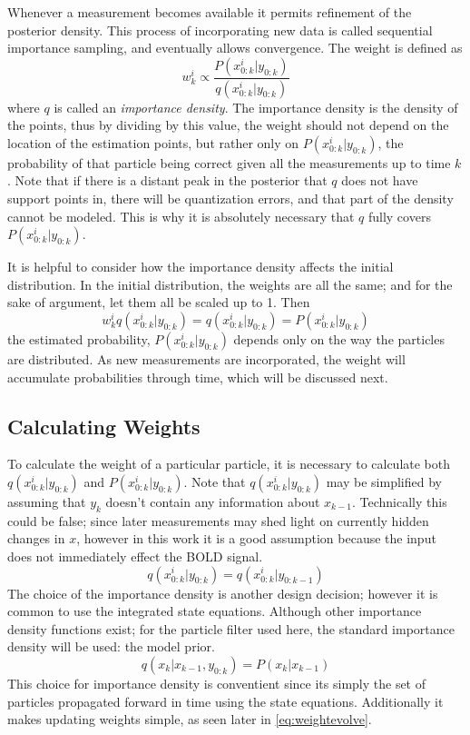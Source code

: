 Whenever a measurement becomes available it permits refinement of the
posterior density.
This process of incorporating new data is called sequential importance sampling,
and eventually allows convergence. The weight is defined as
\begin{equation}
w^i_k \propto \frac{P(x^i_{0:k} | y_{0:k})}{q(x^i_{0:k} | y_{0:k})}
\label{eq:weightfunc}
\end{equation}
where $q$ is called an \emph{importance density}. The importance density
is the density of the points, thus by dividing by this value, the weight
should not depend on the location of the estimation points, but rather
only on $P(x^i_{0:k} | y_{0:k})$, the probability of that particle
being correct given all the measurements up to time $k$. 
Note that if there is a distant peak in
the posterior that $q$ does not have support points in, there will 
be quantization errors, and that part of the density cannot be modeled. 
This is why it is absolutely necessary that $q$ fully covers 
$P(x^i_{0:k} | y_{0:k})$.

It is helpful
to consider how the importance density affects the initial distribution. 
In the initial distribution, the weights are all the same; and for
the sake of argument, let them all be scaled up to 1. Then
\begin{equation}
w^i_k q(x^i_{0:k} | y_{0:k}) = q(x^i_{0:k} | y_{0:k}) = P(x^i_{0:k} | y_{0:k})
\end{equation}
the estimated probability, $P(x^i_{0:k} | y_{0:k})$ depends only on the 
way the particles are distributed. As new measurements are incorporated,
the weight will accumulate probabilities through time, which will be discussed
next. 

\subsection{Calculating Weights}
To calculate the weight of a particular particle, it is necessary to 
calculate both $q(x^i_{0:k} | y_{0:k})$ and $P(x^i_{0:k} | y_{0:k})$.
Note that $q(x^i_{0:k} | y_{0:k})$ may be simplified by assuming that 
$y_k$ doesn't contain any information about $x_{k-1}$. Technically this 
could be false; since later measurements may shed light on currently hidden
changes in $x$, however in this work it is a good assumption because the
input does not immediately effect the \ac{BOLD} signal. 
\begin{equation}
q(x^i_{0:k} | y_{0:k}) = q(x^i_{0:k} | y_{0:k-1})
\label{eq:QAssump}
\end{equation}
The choice of the importance density is another design decision; however
it is common to use the integrated state equations. 
Although other importance density functions exist; for the particle filter
used here, the standard importance density will be used: the model
prior.
\begin{equation}
q(x_k | x_{k-1}, y_{0:k}) =  P(x_k | x_{k-1})
\label{eq:ImportanceDensity}
\end{equation}
This choice for importance density is conventient since its simply 
the set of particles propagated
forward in time using the state equations. Additionally it makes
updating weights simple, as seen later in \autoref{eq:weightevolve}.

